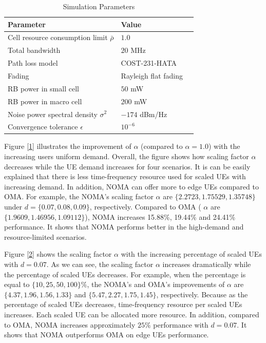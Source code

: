 \documentclass[10pt,journal,final,finalsubmission,twocolumn]{IEEEtran}
\begin{document}
\begin{table}[htbp]
 \caption{\label{tab:test}Simulation Parameters}
 \begin{center}
 \begin{tabular}{lll}
  \toprule
  \textbf{Parameter} & \textbf{Value}  \\
  \midrule
 Cell resource consumption limit $\bar{\rho}$ & $1.0$  \\
 Total bandwidth & $20$ MHz  \\
 Path loss model & COST-231-HATA\\
 Fading &Rayleigh flat fading\\
 RB power in small cell & $50$ mW \\
 RB power in macro cell & $200$ mW \\
  Noise power spectral density $\sigma ^2$ & $-174$ dBm/Hz  \\
 Convergence tolerance $\epsilon$ & $10^{-6}$ \\

  \bottomrule
 \end{tabular}
  \end{center}
\end{table}


Figure \ref{1} illustrates the improvement of $\alpha $ (compared to $\alpha = 1.0$) with the increasing users uniform demand. Overall, the figure shows how scaling factor $\alpha$ decreases while the UE demand increases for four scenarios. It is can be easily explained that there is less time-frequency resource used for scaled UEs with increasing demand. In addition, NOMA can offer more to edge UEs compared to OMA. For example, the NOMA's scaling factor $\alpha$ are $\{2.2723, 1.75529, 1.35748\}$ under $d=\{0.07, 0.08, 0.09\}$, respectively. Compared to OMA ( $\alpha$ are $\{1.9609, 1.46956, 1.09112\}$), NOMA increases 15.88\%, 19.44\% and 24.41\% performance. It shows that NOMA performs better in the high-demand and resource-limited scenarios. 

Figure \ref{2} shows the scaling factor $\alpha $ with the increasing percentage of scaled UEs with $d = 0.07$. As we can see, the scaling factor $\alpha$ increases dramatically while the percentage of scaled UEs decreases. For example, when the percentage is equal to $\{10, 25, 50, 100\}\%$, the NOMA's and OMA's improvements of $\alpha$ are $\{4.37, 1.96, 1.56, 1.33\}$ and $\{5.47, 2.27, 1.75, 1.45\}$, respectively. Because as the percentage of scaled UEs decreases, time-frequency resource per scaled UEs increases. Each scaled UE can be allocated more resource. In addition, compared to OMA, NOMA increases approximately $25\%$ performance with $d=0.07$. It shows that NOMA outperforms OMA on edge UEs performance. 
\end{document}
